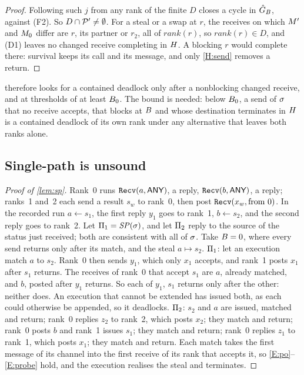 \begin{proof}
Following such $j$ from any rank of the finite $D$ closes a cycle in $\hat G_B$, against (F2).
So $D\cap \mathcal{P}'\ne\emptyset$. For a steal or a swap at $r$, the receives on which $M'$ and
$M_0$ differ are $r$, its partner or $r_2$, all of $\mathit{rank}(r)$, so
$\mathit{rank}(r)\in D$, and (D1) leaves no changed receive completing in $H$. A blocking
$r$ would complete there: survival keeps its call and its message, and only \ref{H:send} removes
a return.
\end{proof}

\noindent \tool therefore looks for a contained deadlock only after a nonblocking changed
receive, and at thresholds of at least $B_0$. The bound is needed: below $B_0$, a send of
$\sigma$ that no receive accepts, that blocks at $B$ and whose destination terminates in
$H$ is a contained deadlock of its own rank under any alternative that leaves both ranks
alone.

\subsection{Single-path is unsound}
\label{app:sp}

\begin{proof}[Proof of \cref{lem:sp}]
Rank~0 runs $\texttt{Recv}(a,\textsf{ANY})$, a reply, $\texttt{Recv}(b,\textsf{ANY})$, a reply; ranks~1 and~2
each send a result $s_w$ to rank~0, then post $\texttt{Recv}(x_w,\text{from }0)$. In the
recorded run $a\gets s_1$, the first reply $y_1$ goes to rank~1, $b\gets s_2$, and the second
reply goes to rank~2. Let $\Pi_1=\mathit{SP}(\sigma)$, and let $\Pi_2$ reply to the source of the
status just received; both are consistent with all of $\sigma$. Take $B=0$, where every send
returns only after its match, and the steal $a\mapsto s_2$.
$\Pi_1$: let an execution match $a$ to $s_2$. Rank~0 then sends $y_1$, which only $x_1$
accepts, and rank~1 posts $x_1$ after $s_1$ returns. The receives of rank~0 that accept $s_1$
are $a$, already matched, and $b$, posted after $y_1$ returns. So each of $y_1$, $s_1$ returns
only after the other: neither does. An execution that cannot be extended has issued both, as
each could otherwise be appended, so it deadlocks.
$\Pi_2$: $s_2$ and $a$ are issued, matched and return; rank~0 replies $z_2$ to rank~2, which
posts $x_2$; they match and return; rank~0 posts $b$ and rank~1 issues $s_1$; they match and
return; rank~0 replies $z_1$ to rank~1, which posts $x_1$; they match and return. Each match
takes the first message of its channel into the first receive of its rank that accepts it, so
\ref{E:po}--\ref{E:probe} hold, and the execution realises the steal and terminates.
\end{proof}

